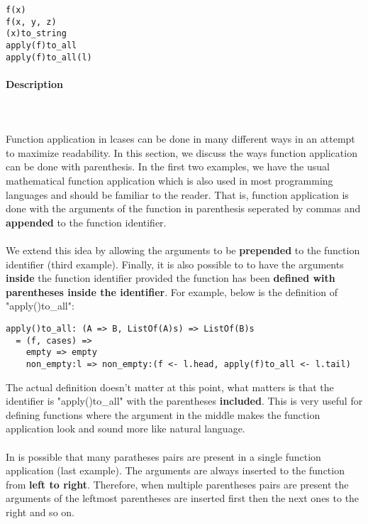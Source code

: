 \documentclass{article}
\def\pend{\mbox{} \\\\}
\begin{document}
\begin{verbatim}
f(x)
f(x, y, z)
(x)to_string
apply(f)to_all
apply(f)to_all(l)
\end{verbatim}

\paragraph{Description}\pend
Function application in lcases can be done in many different ways in an attempt to 
maximize readability. In this section, we discuss the ways function application can
be done with parenthesis. In the first two examples, we have the usual mathematical
function application which is also used in most programming languages and
should be familiar to the reader. That is, function application is done with the 
arguments of the function in parenthesis seperated by commas and \textbf{appended}
to the function identifier.
\\\\
We extend this idea by allowing the arguments to be \textbf{prepended} to the
function identifier (third example). Finally, it is also possible to to have
the arguments \textbf{inside} the function identifier provided the function has
been \textbf{defined with parentheses inside the identifier}. For example,
below is the definition of "apply()to\_all":

\begin{verbatim}
apply()to_all: (A => B, ListOf(A)s) => ListOf(B)s
  = (f, cases) =>
    empty => empty
    non_empty:l => non_empty:(f <- l.head, apply(f)to_all <- l.tail)
\end{verbatim}
The actual definition doesn't matter at this point, what matters is that the 
identifier is "apply()to\_all" with the parentheses \textbf{included}. This is very
useful for defining functions where the argument in the middle makes the function
application look and sound more like natural language.
\\\\
In is possible that many paratheses pairs are present in a single function
application (last example). The arguments are always inserted to the function
from \textbf{left to right}.  Therefore, when multiple parentheses pairs are
present the arguments of the leftmost parentheses are inserted first then the
next ones to the right and so on.
\end{document}
